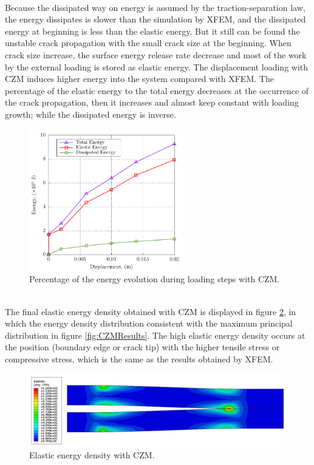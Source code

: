 \documentclass[preprint,review,12pt]{elsarticle}
\begin{document}
\
\\
Because the dissipated way on energy is assumed by the traction-separation law, the energy dissipates is slower than the simulation by XFEM, and the dissipated energy at beginning is less than the elastic energy. But it still can be found the unstable crack propagation with the small crack size at the beginning. When crack size increase, the surface energy release rate decrease and most of the work by the external loading is stored as elastic energy. The displacement loading with CZM induces higher energy into the system compared with XFEM. The percentage of the elastic energy to the total energy decreases at the occurrence of the crack propagation, then it increases and almost keep constant with loading growth; while the dissipated energy is inverse.
\
\\
\begin{figure}[htbp]
   \centering
  \includegraphics[width=0.6\textwidth]{Abaqus/Energy/plot_CZM_Energy.pdf}
   \caption{Percentage of the energy evolution during loading steps with CZM. }
   \label{fig:CZMEnergy}
\end{figure}
\
\\
The final elastic energy density obtained with CZM is displayed in figure \ref{fig:CZMESEDEN},  in which the energy density distribution consistent with the maximum principal distribution in figure \ref{fig:CZMResults}. The high elastic energy density occurs at the position (boundary edge or crack tip) with the higher tensile stress or compressive stress, which is the same as the results obtained by XFEM.
\
\\
\begin{figure}[htbp]
   \centering
  \includegraphics[width=\textwidth]{Abaqus/CZM/CZM_ESEDEN.jpg}
   \caption{Elastic energy density with CZM. }
   \label{fig:CZMESEDEN}
\end{figure}
\end{document}
